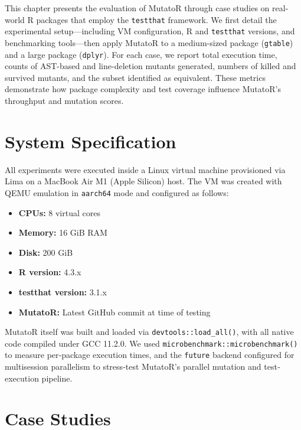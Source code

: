
\begin{chapterabstract}
This chapter presents the evaluation of MutatoR through case studies on real-world R packages that employ the \texttt{testthat} framework. We first detail the experimental setup—including VM configuration, R and \texttt{testthat} versions, and benchmarking tools—then apply MutatoR to a medium-sized package (\texttt{gtable}) and a large package (\texttt{dplyr}). For each case, we report total execution time, counts of AST-based and line-deletion mutants generated, numbers of killed and survived mutants, and the subset identified as equivalent. These metrics demonstrate how package complexity and test coverage influence MutatoR’s throughput and mutation scores.

\end{chapterabstract}

\section{System Specification}

All experiments were executed inside a Linux virtual machine provisioned via Lima on a MacBook Air M1 (Apple Silicon) host.  The VM was created with QEMU emulation in \texttt{aarch64} mode and configured as follows:

\begin{itemize}
  \item \textbf{CPUs:} 8 virtual cores  
  \item \textbf{Memory:} 16 GiB RAM  
  \item \textbf{Disk:} 200 GiB  
  \item \textbf{R version:} 4.3.x  
  \item \textbf{testthat version:} 3.1.x \cite{wickham2011testthat}  
  \item \textbf{MutatoR:} Latest GitHub commit at time of testing  
\end{itemize}

MutatoR itself was built and loaded via \texttt{devtools\allowbreak::\allowbreak load\_all()}, 
with all native code compiled under GCC 11.2.0. We used 
\texttt{microbenchmark\allowbreak::\allowbreak microbenchmark()} 
to measure per‐package execution times, and the \texttt{future} 
backend configured for multisession parallelism to stress‐test 
MutatoR’s parallel mutation and test‐execution pipeline.


\section{Case Studies}

